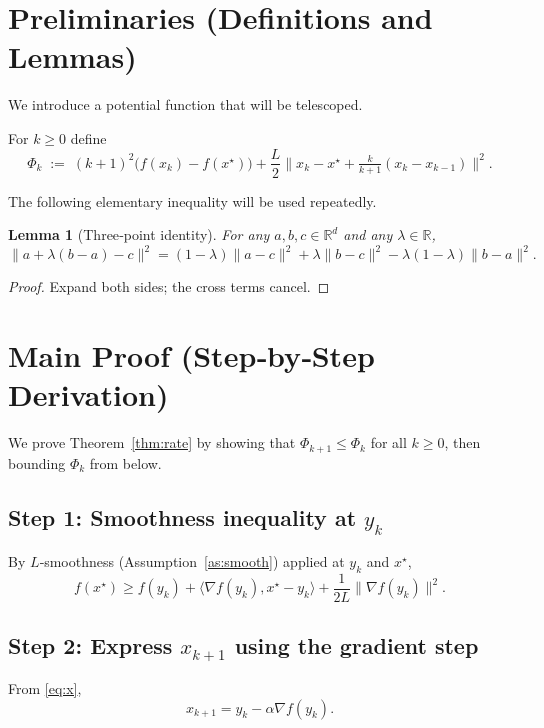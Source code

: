 \documentclass[11pt]{article}
\newtheorem{lemma}{Lemma}
\newcommand{\R}{\mathbb{R}}
\begin{document}
\section{Preliminaries (Definitions and Lemmas)}
We introduce a potential function that will be telescoped.

\begin{definition}[Potential]
For $k\ge 0$ define
\[
\Phi_k \;:=\; (k+1)^2\bigl(f(x_k)-f(x^\star)\bigr) + \frac{L}{2}\|x_k - x^\star + \tfrac{k}{k+1}(x_k-x_{k-1})\|^2 .
\]
\end{definition}

The following elementary inequality will be used repeatedly.

\begin{lemma}[Three‑point identity]\label{lem:three}
For any $a,b,c\in\R^d$ and any $\lambda\in\R$,
\[
\|a+\lambda(b-a)-c\|^2 = (1-\lambda)\|a-c\|^2 + \lambda\|b-c\|^2 - \lambda(1-\lambda)\|b-a\|^2 .
\]
\end{lemma}
\begin{proof}
Expand both sides; the cross terms cancel. \qedhere
\end{proof}

\section{Main Proof (Step‑by‑Step Derivation)}
We prove Theorem~\ref{thm:rate} by showing that $\Phi_{k+1}\le\Phi_k$ for all $k\ge 0$, then bounding $\Phi_k$ from below.

\subsection*{Step 1: Smoothness inequality at $y_k$}
By $L$‑smoothness (Assumption~\ref{as:smooth}) applied at $y_k$ and $x^\star$,
\[
f(x^\star) \ge f(y_k) + \langle\nabla f(y_k),x^\star-y_k\rangle + \frac{1}{2L}\|\nabla f(y_k)\|^2 .
\tag{S1}
\]

\subsection*{Step 2: Express $x_{k+1}$ using the gradient step}
From \eqref{eq:x},
\[
x_{k+1}= y_k - \alpha \nabla f(y_k). \tag{S2}
\]
\end{document}
